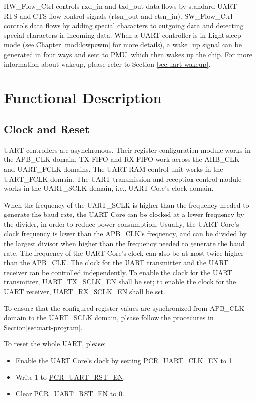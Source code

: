 \documentclass[main\_\_EN.tex]{subfiles}
\begin{document}
HW\_Flow\_Ctrl controls rxd\_in and txd\_out data flows by standard UART RTS and CTS flow control signals (rtsn\_out and ctsn\_in). SW\_Flow\_Ctrl controls data flows by adding special characters to outgoing data and detecting special characters in incoming data. When a UART controller is in Light-sleep mode (see Chapter \ref{mod:lowpowm} \textit{} for more details), a wake\_up signal can be generated in four ways and sent to PMU, which then wakes up the \chipname{} chip. For more information about wakeup, please refer to Section \ref{sec:uart-wakeup}.

\section{Functional Description}

\subsection{Clock and Reset}

UART controllers are asynchronous. Their register configuration module works in the APB\_CLK domain. TX FIFO and RX FIFO work across the AHB\_CLK and UART\_FCLK domains. The UART RAM control unit works in the UART\_FCLK domain. The UART transmission and reception control module works in the UART\_SCLK domain, i.e., UART Core's clock domain.

When the frequency of the UART\_SCLK is higher than the frequency needed to generate the baud rate, the UART Core can be clocked at a lower frequency by the divider, in order to reduce power consumption. Usually, the UART Core's clock frequency is lower than the APB\_CLK's frequency, and can be divided by the largest divisor when higher than the frequency needed to generate the baud rate. The frequency of the UART Core's clock can also be at most twice higher than the APB\_CLK. The clock for the UART transmitter and the UART receiver can be controlled independently. To enable the clock for the UART transmitter, \hyperref[fielddesc:UARTTXSCLKEN]{UART\_TX\_SCLK\_EN} shall be set; to enable the clock for the UART receiver, \hyperref[fielddesc:UARTRXSCLKEN]{UART\_RX\_SCLK\_EN} shall be set.


To ensure that the configured register values are synchronized from APB\_CLK domain to the UART\_SCLK domain, please follow the procedures in Section\ref{sec:uart-program}.


To reset the whole UART, please:
\begin{itemize}
    \item Enable the UART Core's clock by setting \hyperref[fielddesc:PCRUART0CLKEN]{PCR\_UART\_CLK\_EN} to 1.
    \item Write 1 to \hyperref[fielddesc:PCRUART0RSTEN]{PCR\_UART\_RST\_EN}.
    \item Clear \hyperref[fielddesc:PCRUART0RSTEN]{PCR\_UART\_RST\_EN} to 0.

\end{itemize}
\end{document}
